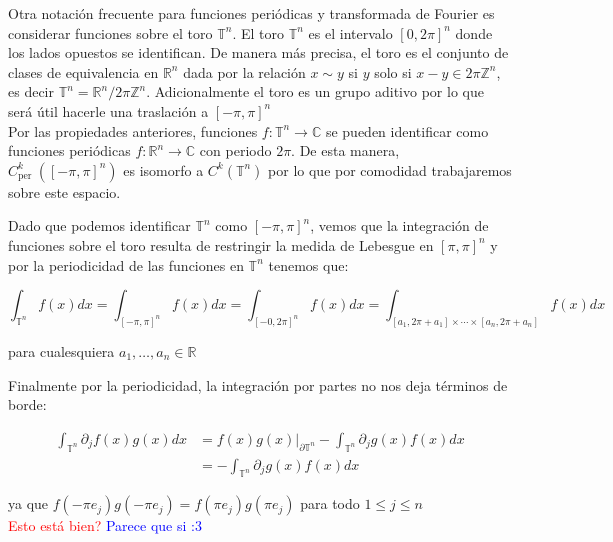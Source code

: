 \documentclass[12pt]{article}
\newcommand\R{\ensuremath{\mathbb{R}}}
\begin{document}
Otra notación frecuente para funciones periódicas y transformada de Fourier es considerar funciones sobre el toro $\mathbb{T}^n$. El toro $\mathbb{T}^n$ es el intervalo $[0,2 \pi]^n$ donde los lados opuestos se identifican. De manera más precisa, el toro es el conjunto de clases de equivalencia en $\mathbb{R}^n$ dada por la relación $x \sim y$ si $y$ solo si $x-y \in 2 \pi \mathbb{Z}^n$, es decir $\mathbb{T}^n=\mathbb{R}^n/ 2 \pi \mathbb{Z}^n$. Adicionalmente el toro es un grupo aditivo por lo que será útil hacerle una traslación a $[-\pi,\pi]^n$\\

Por las propiedades anteriores, funciones $f: \mathbb{T}^n \rightarrow \mathbb{C}$ se pueden identificar como funciones periódicas $f: \mathbb{R}^n \rightarrow \mathbb{C}$ con periodo $2 \pi$. De esta manera, $C_{\text {per }}^k([-\pi, \pi]^n)$ es isomorfo a $C^k(\mathbb{T}^n)$ por lo que por comodidad trabajaremos sobre este espacio.\\

\begin{note}
    Dado que  podemos identificar $\mathbb{T}^n$ como $[-\pi,\pi]^n$, vemos que la integración de funciones sobre el toro resulta de restringir la medida de Lebesgue en $[\pi,\pi]^n$ y por la periodicidad de las funciones en $\mathbb{T}^n$ tenemos que:

    $$\int_{\mathbb{T}^n} f(x) d x=\int_{[-\pi,\pi]^n} f(x) d x=\int_{[-0,2\pi]^n} f(x) d x=\int_{\left[a_1, 2\pi+a_1\right] \times \cdots \times\left[a_n, 2\pi+a_n\right]} f(x) d x$$

    para cualesquiera $a_1,\ldots,a_n \in \R$\\
    

\end{note}

    Finalmente por la periodicidad, la integración por partes no nos deja términos de borde:

    \begin{align*}
        \int_{\mathbb{T}^n} \partial_j f(x) g(x) d x&=f(x)g(x)\big|_{\partial \mathbb{T}^n}-\int_{\mathbb{T}^n} \partial_j g(x) f(x) d x\\
        &=-\int_{\mathbb{T}^n} \partial_j g(x) f(x) d x
    \end{align*}

ya que $f(-\pi e_j)g(-\pi e_j)=f(\pi e_j)g(\pi e_j)$ para todo $1\leq j\leq n$\\

\textcolor{red}{Esto está bien?}
\textcolor{blue}{Parece que si :3}

\newpage


\nocite{*}
\end{document}
